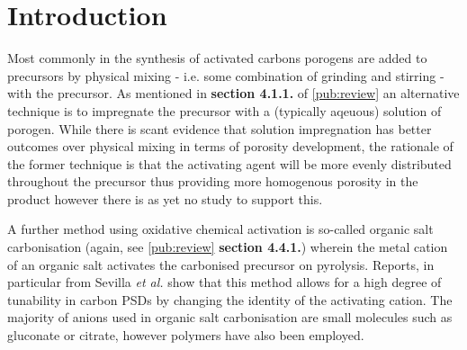 \newpage

\section{Introduction}
Most commonly in the synthesis of activated carbons \glspl{porogen} are added to precursors by physical mixing - i.e. some combination of grinding and stirring - with the precursor.\citep{Aljumialy2020Porous, Blankenship2017Cigarette, Altwala2020Predictable, Sevilla2016Highly} As mentioned in \textbf{section 4.1.1.} of \ref{pub:review} an alternative technique is to impregnate the precursor with a (typically aqeuous) solution of \gls{porogen}.\citep{Botome2017Preparation, Ge2019Highly, Adlak2021Physicochemical, Shi2021Copper, Han2021Mulch} While there is scant evidence that solution impregnation has better outcomes over physical mixing in terms of porosity development, the rationale of the former technique is that the \gls{activating agent} will be more evenly distributed throughout the precursor thus providing more homogenous porosity in the product however there is as yet no study to support this. 

A further method using oxidative chemical activation is so-called organic salt carbonisation (again, see \ref{pub:review} \textbf{section 4.4.1.}) wherein the metal cation of an organic salt activates the carbonised precursor on pyrolysis. Reports, in particular from Sevilla \textit{et al.} show that this method allows for a high degree of tunability in carbon PSDs by changing the identity of the activating cation.\citep{Sevilla2013general, Tsumura2014Structure, Ferrero2015Mesoporous, Ferrero2016Efficient, Fuertes2015Hierarchical, Roberts2015Hierarchically, Yadav20123D, Yang2018Spontaneous} The majority of anions used in organic salt carbonisation are small molecules such as gluconate or citrate,\citep{Sevilla2013general, Yang2017Template, Sevilla2014Direct, Tsumura2014Structure, Ferrero2015Mesoporous, Ferrero2016Efficient, Fuertes2015Hierarchical, Yang2020Production, Fuertes2014One} however polymers have also been employed.\citep{Puthusseri20143D, Roberts2015Hierarchically, Yadav20123D, Hines2004Surface} 


